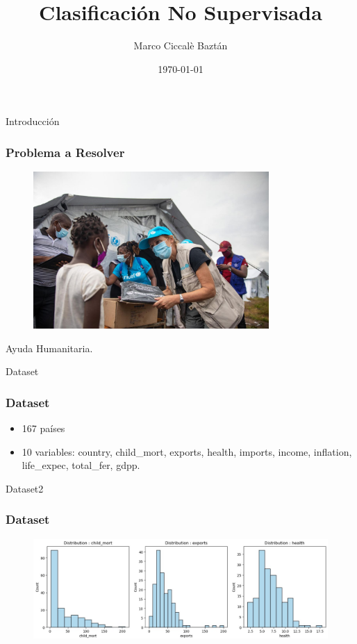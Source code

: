 \documentclass{beamer}
\title{Clasificación No Supervisada}
\author{Marco Ciccalè Baztán}
\institute{UPM}
\date{\today}
\begin{document}
\begin{frame}
  \titlepage
\end{frame}

\begin{frame}{Introducción}
  \frametitle{Problema a Resolver}
  \centering
  \begin{figure}
    \includegraphics[width=0.8\textwidth]{../images/slides/ayuda-humanitaria.jpg}
  \end{figure}
  Ayuda Humanitaria.
\end{frame}

\begin{frame}{Dataset}
  \frametitle{Dataset}
  \begin{itemize}
    \item 167 países
    \pause
    \item 10 variables: country\pause, child\_mort\pause, exports\pause, health\pause, imports\pause, income\pause, inflation\pause, life\_expec\pause, total\_fer\pause, gdpp.
  \end{itemize}
\end{frame}

\begin{frame}{Dataset2}
  \frametitle{Dataset}
  \centering
  \begin{figure}
    \includegraphics[width=\textwidth]{../images/data/features-analysis-1.jpg}
  \end{figure}
\end{frame}
\end{document}
